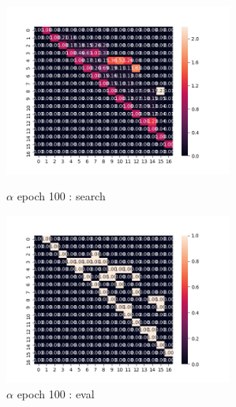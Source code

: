 \documentclass[twocolumn]{jarticle}     %
\begin{document}
\begin{figure}[tb]
 \begin{minipage}{0.5\hsize}
 	\begin{center}
 		\includegraphics[clip,width=75mm]{alpha_100.png}
 		\caption{$\alpha$ epoch 100 : search}
 		\label{fig:alpha100}
 	\end{center}
 \end{minipage}
 \begin{minipage}{0.5\hsize}
 	\begin{center}
 		\includegraphics[clip,width=75mm]{alpha_100e.png}
 		\caption{$\alpha$ epoch 100 : eval}
 		\label{fig:alpha100e}
 	\end{center}
 \end{minipage}
\end{figure}
\end{document}
